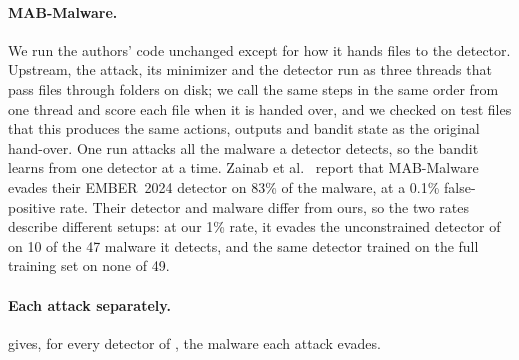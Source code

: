 \paragraph{MAB-Malware.} We run the authors' code unchanged except for how it hands files to the detector. Upstream,
the attack, its minimizer and the detector run as three threads that pass files through folders on disk; we call the
same steps in the same order from one thread and score each file when it is handed over, and we checked on test files
that this produces the same actions, outputs and bandit state as the original hand-over. One run attacks all the
malware a detector detects, so the bandit learns from one detector at a time. Zainab et al.~\cite{zainab2026breaking}
report that MAB-Malware evades their EMBER~2024 detector on 83\% of the malware, at a 0.1\% false-positive rate. Their
detector and malware differ from ours, so the two rates describe different setups: at our 1\% rate, it evades the
unconstrained detector of  on 10 of the 47 malware it detects, and the same detector trained
on the full training set on none of 49.

\paragraph{Each attack separately.}  gives, for every detector of
, the malware each attack evades.

